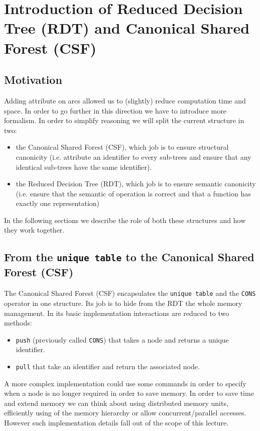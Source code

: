 \documentclass[a4paper,10pt]{article}
\begin{document}
\section{Introduction of Reduced Decision Tree (RDT) and Canonical Shared Forest (CSF)}
\subsection{Motivation}
Adding attribute on arcs allowed us to (slightly) reduce computation time and space.
In order to go further in this direction we have to introduce more formalism.
In order to simplify reasoning we will split the current structure in two:\begin{itemize}
\item the Canonical Shared Forest (CSF), which job is to ensure structural canonicity (i.e. attribute an identifier to every sub-trees and ensure that any identical sub-trees have the same identifier).
\item the Reduced Decision Tree (RDT), which job is to ensure semantic canonicity (i.e. ensure that the semantic of operation is correct and that a function has exactly one representation)
\end{itemize}
In the following sections we describe the role of both these structures and how they work together.

\subsection{From the \texttt{unique table} to the Canonical Shared Forest (CSF)}
The Canonical Shared Forest (CSF) encapsulates the \texttt{unique table} and the \texttt{CONS} operator in one structure.
Its job is to hide from the RDT the whole memory management.
In its basic implementation interactions are reduced to two methods:\begin{itemize}
\item \texttt{push} (previously called \texttt{CONS}) that takes a node and returns a unique identifier.
\item \texttt{pull} that take an identifier and return the associated node.
\end{itemize}
A more complex implementation could use some commands in order to specify when a node is no longer required in order to save memory.
In order to save time and extend memory we can think about using distributed memory units, efficiently using of the memory hierarchy or allow concurrent/parallel accesses.
However such implementation details fall out of the scope of this lecture.
\end{document}
